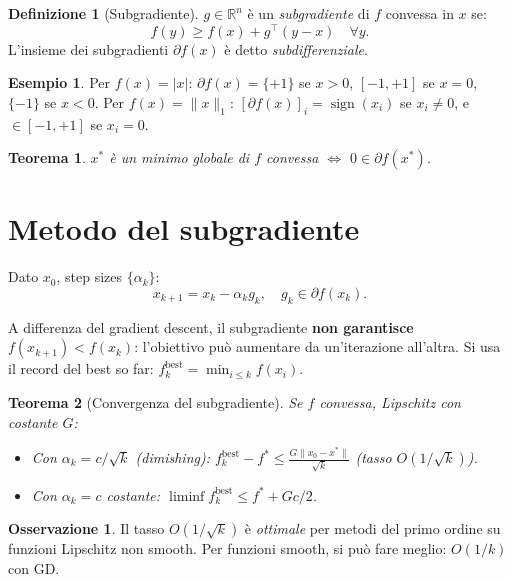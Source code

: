\documentclass[11pt, a4paper, twoside]{book}
\theoremstyle{definition}
\newtheorem{defn}{Definizione}[chapter]
\newtheorem{example}{Esempio}[chapter]
\newtheorem{remark}{Osservazione}[chapter]
\theoremstyle{plain}
\newtheorem{thm}{Teorema}[chapter]
\theoremstyle{remark}
\DeclareMathOperator{\sign}{sign}
\newcommand{\R}{\mathbb{R}}
\begin{document}
\begin{defn}[Subgradiente]
$g \in \R^n$ è un \emph{subgradiente} di $f$ convessa in $x$ se:
\[
  f(y) \geq f(x) + g^\top (y - x) \quad \forall y.
\]
L'insieme dei subgradienti $\partial f(x)$ è detto \emph{subdifferenziale}.
\end{defn}

\begin{example}
Per $f(x) = |x|$: $\partial f(x) = \{+1\}$ se $x > 0$, $[-1,+1]$ se $x = 0$, $\{-1\}$ se $x < 0$.
Per $f(x) = \|x\|_1$: $[\partial f(x)]_i = \sign(x_i)$ se $x_i \neq 0$, e $\in [-1,+1]$ se $x_i = 0$.
\end{example}

\begin{thm}
$x^*$ è un minimo globale di $f$ convessa $\Leftrightarrow$ $0 \in \partial f(x^*)$.
\end{thm}

\section{Metodo del subgradiente}

\begin{algobox}
Dato $x_0$, step sizes $\{\alpha_k\}$:
\[
  x_{k+1} = x_k - \alpha_k g_k, \quad g_k \in \partial f(x_k).
\]
\end{algobox}

\begin{warningbox}
A differenza del gradient descent, il subgradiente \textbf{non garantisce} $f(x_{k+1}) < f(x_k)$: l'obiettivo può aumentare da un'iterazione all'altra. Si usa il record del best so far: $f_k^{\mathrm{best}} = \min_{i \leq k} f(x_i)$.
\end{warningbox}

\begin{thm}[Convergenza del subgradiente]
Se $f$ convessa, Lipschitz con costante $G$:
\begin{itemize}
  \item Con $\alpha_k = c/\sqrt{k}$ (dimishing): $f_k^{\mathrm{best}} - f^* \leq \frac{G \|x_0 - x^*\|}{\sqrt{k}}$ (tasso $O(1/\sqrt{k})$).
  \item Con $\alpha_k = c$ costante: $\liminf f_k^{\mathrm{best}} \leq f^* + Gc/2$.
\end{itemize}
\end{thm}

\begin{remark}
Il tasso $O(1/\sqrt{k})$ è \emph{ottimale} per metodi del primo ordine su funzioni Lipschitz non smooth. Per funzioni smooth, si può fare meglio: $O(1/k)$ con GD.
\end{remark}
\end{document}
